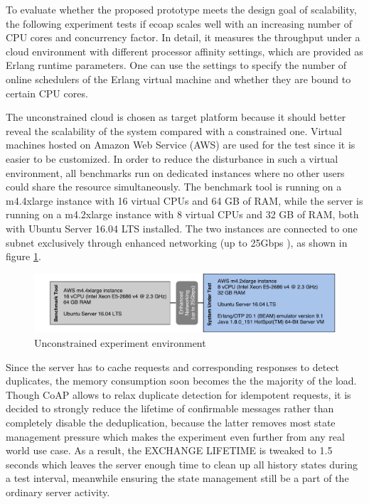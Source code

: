To evaluate whether the proposed prototype meets the design goal of scalability, the following experiment tests if ecoap scales well with an increasing number of CPU cores and concurrency factor. In detail, it measures the throughput under a cloud environment with different processor affinity settings, which are provided as Erlang runtime parameters. One can use the settings to specify the number of online schedulers of the Erlang virtual machine and whether they are bound to certain CPU cores.

The unconstrained cloud is chosen as target platform because it should better reveal the scalability of the system compared with a constrained one. Virtual machines hosted on Amazon Web Service (AWS) are used for the test since it is easier to be customized. In order to reduce the disturbance in such a virtual environment, all benchmarks run on dedicated instances \cite{aws_dedicated_instance} where no other users could share the resource simultaneously. The benchmark tool is running on a m4.4xlarge instance with 16 virtual CPUs and 64 GB of RAM, while the server is running on a m4.2xlarge instance with 8 virtual CPUs and 32 GB of RAM, both with Ubuntu Server 16.04 LTS installed. The two instances are connected to one subnet exclusively through enhanced networking (up to 25Gbps \cite{aws_instance}), as shown in figure \ref{fig:experiment_setting_aws}. 

\begin{figure}[!htbp]
\centering
\includegraphics[scale = 0.55]{experiment_setting_aws}
\caption{Unconstrained experiment environment}
\label{fig:experiment_setting_aws}
\end{figure}

Since the server has to cache requests and corresponding responses to detect duplicates, the memory consumption soon becomes the the majority of the load. Though CoAP allows to relax duplicate detection for idempotent requests, it is decided to strongly reduce the lifetime of confirmable messages rather than completely disable the deduplication, because the latter removes most state management pressure which makes the experiment even further from any real world use case. As a result, the EXCHANGE LIFETIME is tweaked to 1.5 seconds which leaves the server enough time to clean up all history states during a test interval, meanwhile ensuring the state management still be a part of the ordinary server activity.


